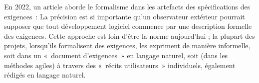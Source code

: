 {En 2022, un article aborde le formalisme dans les artefacts des spécifications des exigences~:
 {La précision est si importante qu'un observateur extérieur pourrait supposer que tout développement logiciel commence par une description formelle des exigences. Cette approche est loin d'être la norme aujourd'hui ; la plupart des projets, lorsqu'ils formalisent des exigences, les expriment de manière informelle, soit dans un «~document d'exigences~» en langage naturel, soit (dans les méthodes agiles) à travers des «~récits utilisateurs~» individuels, également rédigés en langage naturel.} {\cite{bruel_requirement_2022}}

}{}

